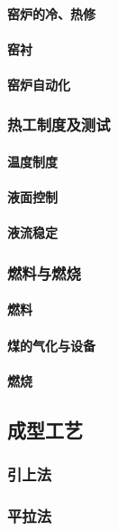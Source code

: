 \documentclass[UTF8]{../../ApplicationUniverse}
\begin{document}
            \paragraph{窑炉的冷、热修}
            \paragraph{窑衬}
            \paragraph{窑炉自动化}
        \subsubsection{热工制度及测试}
            \paragraph{温度制度}
            \paragraph{液面控制}
            \paragraph{液流稳定}
        \subsubsection{燃料与燃烧}
            \paragraph{燃料}
            \paragraph{煤的气化与设备}
            \paragraph{燃烧}
    \subsection{成型工艺}
        \subsubsection{引上法}
        \subsubsection{平拉法}
\end{document}
